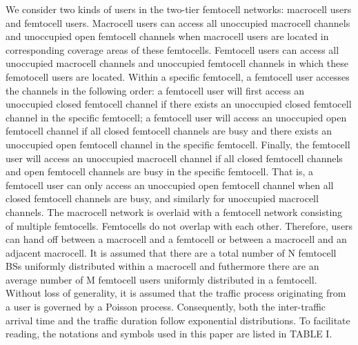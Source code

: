 \documentclass[10pt,final,journal,letterpaper,twoside,twocolumn]{IEEEtran}
\begin{document}
We consider two kinds of users in the two-tier femtocell networks: macrocell
users and femtocell users. Macrocell users can access all unoccupied
macrocell channels and unoccupied open femtocell channels when macrocell users are located in corresponding coverage areas of these femtocells. Femtocell users can
access all unoccupied macrocell channels and unoccupied femtocell
channels in which these femotocell users are located. Within a specific femtocell, a femtocell user accesses the channels in the following order: a femtocell user will first access an unoccupied closed femtocell channel if there exists an unoccupied closed femtocell channel in the specific femtocell; a femtocell user will access an unoccupied open femtocell channel if all closed femtocell channels are busy and there exists an unoccupied open femtocell channel in the specific femtocell. Finally, the femtocell user will access an unoccupied macrocell channel if all closed femtocell channels and open femtocell channels are busy in the specific femtocell. That is, a femtocell user can only access an unoccupied open femtocell channel when all closed femtocell channels are busy, and similarly for unoccupied macrocell channels. The macrocell network is overlaid with a femtocell network consisting
of multiple femtocells. Femtocells do not overlap with each other.
Therefore, users can hand off between a macrocell and a femtocell or between
a macrocell and an adjacent macrocell. It is assumed that there are a total number of N femtocell BSs uniformly distributed within a macrocell and futhermore there are an average number of M femtocell users uniformly distributed in a femtocell. Without loss of generality, it is assumed that the traffic process originating from a user is governed by a Poisson process. Consequently, both the inter-traffic arrival time and the traffic duration follow exponential distributions. To facilitate reading, the notations and symbols used in this paper are listed in TABLE I.
\end{document}
